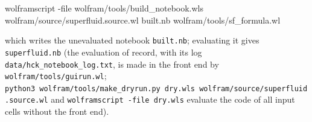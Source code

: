 \documentclass[
  10pt,
]{article}
\newenvironment{Shaded}{}{}
\newcommand{\AttributeTok}[1]{\textcolor[rgb]{0.49,0.56,0.16}{#1}}
\newcommand{\ExtensionTok}[1]{#1}
\newcommand{\NormalTok}[1]{#1}
\begin{document}
\begin{Shaded}
\begin{Highlighting}[]
\ExtensionTok{wolframscript} \AttributeTok{{-}file}\NormalTok{ wolfram/tools/build\_notebook.wls wolfram/source/superfluid.source.wl built.nb wolfram/tools/sf\_formula.wl}
\end{Highlighting}
\end{Shaded}

which writes the unevaluated notebook \texttt{built.nb}; evaluating it
gives \texttt{superfluid.nb} (the evaluation of record, with its log
\texttt{data/hck\_notebook\_log.txt}, is made in the front end by
\texttt{wolfram/tools/guirun.wl};
\texttt{python3\ wolfram/tools/make\_dryrun.py\ dry.wls\ wolfram/source/superfluid.source.wl}
and \texttt{wolframscript\ -file\ dry.wls} evaluate the code of all
input cells without the front end).
\end{document}
